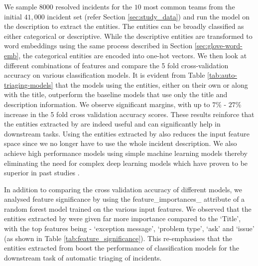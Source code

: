 We sample $8000$ resolved incidents for the $10$ most common teams from the initial $41,000$ incident set (refer Section \ref{sec:study_data}) and run the \softner{} model on the description to extract the entities. The \softner{} entities can be broadly classified as either categorical or descriptive. While the descriptive entities are transformed to word embeddings using the same process described in Section \ref{sec:glove-word-emb}, the categorical entities are encoded into one-hot vectors. We then look at different combinations of features and compare the 5 fold cross-validation accuracy on various classification models. It is evident from Table \ref{tab:auto-triaging-models} that the models using the \softner{} entities, either on their own or along with the title, outperform the baseline models that use only the title and description information. We observe significant margins, with up to $7$\% - $27$\% increase in the 5 fold cross validation accuracy scores. These results reinforce that the entities extracted by \softner{} are indeed useful and can significantly help in downstream tasks. Using the entities extracted by \softner{} also reduces the input feature space since we no longer have to use the whole incident description. We also achieve high performance models using simple machine learning models thereby eliminating the need for complex deep learning models which have proven to be superior in past studies \cite{EmpiricalIcMICSE2019}.

In addition to comparing the cross validation accuracy of different models, we analysed feature significance by using the feature\_importances\_ attribute of a random forest model trained on the various input features. We observed that the entities extracted by \softner{} were given far more importance compared to the `Title', with the top features being - `exception message',  `problem type', `ask' and `issue' (as shown in Table \ref{tab:feature_significance}). This re-emphasises that the entities extracted from \softner{} boost the performance of classification models for the downstream task of automatic triaging of incidents.


